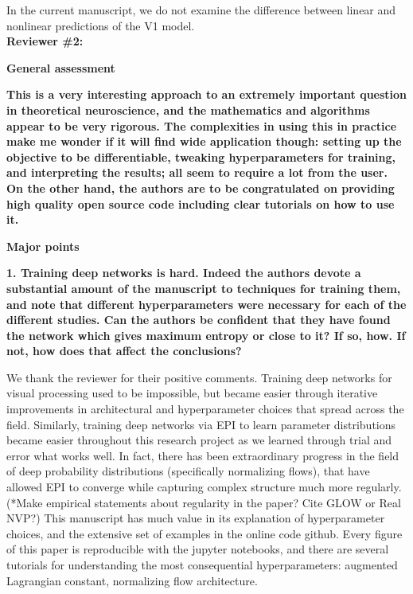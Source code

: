 \documentclass[11pt,a4paper]{article}
\begin{document}
In the current manuscript, we do not examine the difference between linear and nonlinear predictions of the V1 model. \\

{\Large \textbf{Reviewer \#2: }}

\textbf{General assessment }

\textbf{This is a very interesting approach to an extremely important question in theoretical neuroscience, and the mathematics and algorithms appear to be very rigorous. The complexities in using this in practice make me wonder if it will find wide application though: setting up the objective to be differentiable, tweaking hyperparameters for training, and interpreting the results; all seem to require a lot from the user. On the other hand, the authors are to be congratulated on providing high quality open source code including clear tutorials on how to use it. }

\textbf{Major points }

\textbf{1. Training deep networks is hard. Indeed the authors devote a substantial amount of the manuscript to techniques for training them, and note that different hyperparameters were necessary for each of the different studies. Can the authors be confident that they have found the network which gives maximum entropy or close to it? If so, how. If not, how does that affect the conclusions? }

We thank the reviewer for their positive comments.  Training deep networks for visual processing used to be impossible, but became easier through iterative improvements in architectural and hyperparameter choices that spread across the field.  Similarly, training deep networks via EPI to learn parameter distributions became easier throughout this research project as we learned through trial and error what works well.  In fact, there has been extraordinary progress in the field of deep probability distributions (specifically normalizing flows), that have allowed EPI to converge while capturing complex structure much more regularly.  (*Make empirical statements about regularity in the paper? Cite GLOW or Real NVP?) This manuscript has much value in its explanation of hyperparameter choices, and the extensive set of examples in the online code github. Every figure of this paper is reproducible with the jupyter notebooks, and there are several tutorials for understanding the most consequential hyperparameters: augmented Lagrangian constant, normalizing flow architecture.  
\end{document}

